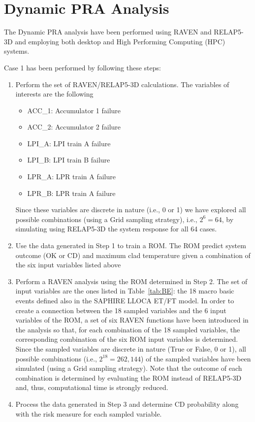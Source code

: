 \section{Dynamic PRA Analysis}
\label{sec:RISMCanalysis}

The Dynamic PRA analysis have been performed using RAVEN and RELAP5-3D and employing 
both desktop and High Performing Computing (HPC) systems. 

Case 1 has been performed by following these steps:
\begin{enumerate}
	\item Perform the set of RAVEN/RELAP5-3D calculations. The variables of interests
	      are the following 
	      \begin{itemize}
	      	\item ACC\_1: Accumulator 1 failure
	      	\item ACC\_2: Accumulator 2 failure
	      	\item LPI\_A: LPI train A failure
	      	\item LPI\_B: LPI train B failure
	      	\item LPR\_A: LPR train A failure
	      	\item LPR\_B: LPR train A failure
	      \end{itemize}
	      Since these variables are discrete in nature (i.e., 0 or 1) we have explored all
	      possible combinations (using a Grid sampling strategy), i.e., $2^6=64$, 
	      by simulating using RELAP5-3D the system response for all 64 cases.
	\item Use the data generated in Step 1 to train a ROM. The ROM predict system outcome
	      (OK or CD) and maximum clad temperature given a combination of the six input 
	      variables listed above
	\item Perform a RAVEN analysis using the ROM determined in Step 2. The set of input 
	      variables are the ones listed in Table~\ref{tab:BE}: the 18 macro basic events defined also 
	      in the SAPHIRE LLOCA ET/FT model. 
	      In order to create a connection between the 18 sampled variables and the 6 input 
	      variables of the ROM, a set of six RAVEN functions have been introduced in the analysis
	      so that, for each combination of the 18 sampled variables, the corresponding combination
	      of the six ROM input variables is determined.
	      Since the sampled variables are discrete in nature (True or False, 0 or 1), all possible
	      combinations (i.e., $2^{18}=262,144$) of the sampled variables have been simulated 
	      (using a Grid sampling strategy).
	      Note that the outcome of each combination is determined by evaluating the ROM instead 
	      of RELAP5-3D and, thus, computational time is strongly reduced. 
	\item Process the data generated in Step 3 and determine CD probability along with the risk
	      measure for each sampled variable.
\end{enumerate}

